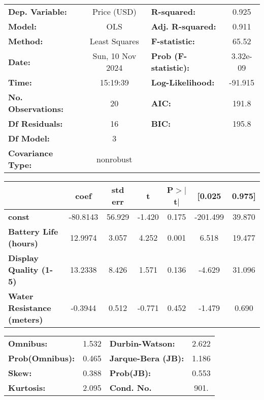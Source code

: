 \documentclass[11pt]{article}
\begin{document}
    \begin{center}
\begin{tabular}{lclc}
\toprule
\textbf{Dep. Variable:}            &   Price (USD)    & \textbf{  R-squared:         } &     0.925   \\
\textbf{Model:}                    &       OLS        & \textbf{  Adj. R-squared:    } &     0.911   \\
\textbf{Method:}                   &  Least Squares   & \textbf{  F-statistic:       } &     65.52   \\
\textbf{Date:}                     & Sun, 10 Nov 2024 & \textbf{  Prob (F-statistic):} &  3.32e-09   \\
\textbf{Time:}                     &     15:19:39     & \textbf{  Log-Likelihood:    } &   -91.915   \\
\textbf{No. Observations:}         &          20      & \textbf{  AIC:               } &     191.8   \\
\textbf{Df Residuals:}             &          16      & \textbf{  BIC:               } &     195.8   \\
\textbf{Df Model:}                 &           3      & \textbf{                     } &             \\
\textbf{Covariance Type:}          &    nonrobust     & \textbf{                     } &             \\
\bottomrule
\end{tabular}
\begin{tabular}{lcccccc}
                                   & \textbf{coef} & \textbf{std err} & \textbf{t} & \textbf{P$> |$t$|$} & \textbf{[0.025} & \textbf{0.975]}  \\
\midrule
\textbf{const}                     &     -80.8143  &       56.929     &    -1.420  &         0.175        &     -201.499    &       39.870     \\
\textbf{Battery Life (hours)}      &      12.9974  &        3.057     &     4.252  &         0.001        &        6.518    &       19.477     \\
\textbf{Display Quality (1-5)}     &      13.2338  &        8.426     &     1.571  &         0.136        &       -4.629    &       31.096     \\
\textbf{Water Resistance (meters)} &      -0.3944  &        0.512     &    -0.771  &         0.452        &       -1.479    &        0.690     \\
\bottomrule
\end{tabular}
\begin{tabular}{lclc}
\textbf{Omnibus:}       &  1.532 & \textbf{  Durbin-Watson:     } &    2.622  \\
\textbf{Prob(Omnibus):} &  0.465 & \textbf{  Jarque-Bera (JB):  } &    1.186  \\
\textbf{Skew:}          &  0.388 & \textbf{  Prob(JB):          } &    0.553  \\
\textbf{Kurtosis:}      &  2.095 & \textbf{  Cond. No.          } &     901.  \\
\bottomrule
\end{tabular}
\end{center}
\end{document}
